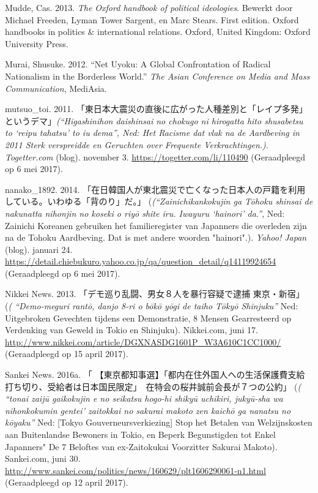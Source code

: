 \documentclass[10.5pt,dutch,]{article}
\begin{document}
\hypertarget{ref-muddeux5foxfordux5f2013}{}
Mudde, Cas. 2013. \emph{The Oxford handbook of political ideologies}.
Bewerkt door Michael Freeden, Lyman Tower Sargent, en Marc Stears. First
edition. Oxford handbooks in politics \& international relations.
Oxford, United Kingdom: Oxford University Press.

\hypertarget{ref-muraiux5fnetux5f2012}{}
Murai, Shusuke. 2012. “Net Uyoku: A Global Confrontation of Radical
Nationalism in the Borderless World.” \emph{The Asian Conference on Media
and Mass Communication}, MediAsia.

\hypertarget{ref-mutsuoux5ftoiux5fhigashinihonux5f2011}{}
mutsuo_toi. 2011. 「東日本大震災の直後に広がった人種差別と「レイプ多発」というデマ」\emph{(“Higashinihon daishinsai no chokugo ni hirogatta hito shusabetsu to `reipu tahatsu’ to iu dema”, Ned: Het Racisme dat vlak na de Aardbeving in 2011 Sterk verspreidde en Geruchten over Frequente Verkrachtingen.)}. \emph{Togetter.com} (blog). november 3. \url{https://togetter.com/li/110490} (Geraadpleegd op 6 mei 2017).

\hypertarget{ref-nanakoux5f1892ux5fzainichikankokujinux5f2014}{}
nanako_1892. 2014. 「在日韓国人が東北震災で亡くなった日本人の戸籍を利用している。いわゆる「背のり」だ。」 (\emph{(“Zainichikankokujin ga Tōhoku shinsai de nakunatta nihonjin no koseki o riyō shite iru. Iwayuru `hainori’ da.”}, Ned: Zainichi Koreanen gebruiken het familieregister van Japanners die overleden zijn na de Tohoku Aardbeving. Dat is met andere woorden "hainori".). \emph{Yahoo! Japan} (blog). januari 24. \url{https://detail.chiebukuro.yahoo.co.jp/qa/question_detail/q14119924654} (Geraadpleegd op 6 mei 2017).

\hypertarget{ref-nikkeiux5fnewsux5fdemo-meguriux5f2013}{}
Nikkei News. 2013. 「デモ巡り乱闘、男女８人を暴行容疑で逮捕 東京・新宿」 (\emph{( “Demo-meguri rantō, danjo 8-ri o bōkō yōgi de taiho Tōkyō Shinjuku”} Ned: Uitgebroken Gevechten tijdens een Demonstratie, 8 Mensen Gearresteerd op Verdenking van Geweld in Tokio en Shinjuku). Nikkei.com, juni 17. \url{http://www.nikkei.com/article/DGXNASDG1601P_W3A610C1CC1000/} (Geraadpleegd op 15 april 2017).

\hypertarget{ref-sankeiux5fnewsux5ftokyochiji-senux5f2016}{}
Sankei News. 2016a. 「 【東京都知事選】「都内在住外国人への生活保護費支給打ち切り、受給者は日本国民限定」　在特会の桜井誠前会長が７つの公約」 (\emph{( “tonai zaijū gaikokujin e no seikatsu hogo-hi shikyū uchikiri, jukyū-sha wa nihonkokumin gentei’ zaitokkai no sakurai makoto zen kaichō ga nanatsu no kōyaku”} Ned: [Tokyo Gouverneursverkiezing] Stop het Betalen van Welzijnskosten aan Buitenlandse Bewoners in Tokio, en Beperk Begunstigden tot Enkel Japanners" De 7 Beloftes van ex-Zaitokukai Voorzitter Sakurai Makoto). Sankei.com, juni 30. \url{http://www.sankei.com/politics/news/160629/plt1606290061-n1.html} (Geraadpleegd op 12 april 2017).
\end{document}
